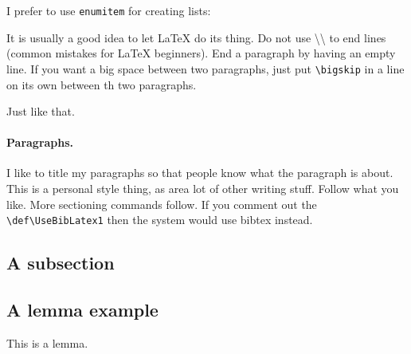 \documentclass[12pt]{article}
\begin{document}
\bigskip

I prefer to use \texttt{enumitem} for creating lists:


\bigskip%

It is usually a good idea to let \LaTeX{} do its thing. Do not use
\textbackslash\textbackslash{} to end lines (common mistakes for
\LaTeX{} beginners). End a paragraph by having an empty line. If you
want a big space between two paragraphs, just put
\texttt{\textbackslash{big{}skip}} in a line on its own between th two
paragraphs.

\bigskip

Just like that.


\paragraph{Paragraphs.}

I like to title my paragraphs so that people know what the paragraph
is about. This is a personal style thing, as area lot of other writing
stuff. Follow what you like. More sectioning commands follow. If you
comment out the
\texttt{\textbackslash{}def\textbackslash{}UseBibLatex{1}} then the
system would use bibtex instead.

\subsection{A subsection}

\subsection{A lemma example}

\begin{lemma}
    This is a lemma.
\end{lemma}


\end{document}
